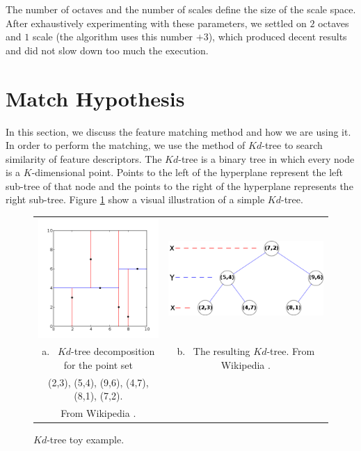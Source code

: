 \documentclass[]{IEEEtran}
\begin{document}
  The number of octaves and the number of scales define the size of the scale space. After exhaustively experimenting with these parameters, we settled on $2$ octaves and $1$ scale (the algorithm uses this number $+ 3$), which produced decent results and did not slow down too much the execution.

  \section{Match Hypothesis}
  In this section, we discuss the feature matching method and how we are using it. In order to perform the matching, we use the method of $Kd$-tree\cite{kd_tree} to search similarity of feature descriptors.
  The $Kd$-tree is a binary tree in which every node is a $K$-dimensional point. Points to the left of the hyperplane represent the left sub-tree of that node and the points to the right of the hyperplane represents the right sub-tree\cite{sift_kdtree}. Figure \ref{fig:kdtree} show a visual illustration of a simple $Kd$-tree.

\begin{figure}[tb]
  \centering
  \begin{tabular}{c c}
  \includegraphics[width=0.23\linewidth]{./figures/kdtree/kdtree_2d.png} &
  \includegraphics[width=0.4\linewidth]{./figures/kdtree/kdtree.png}\\
  a.~ $Kd$-tree decomposition for the point set & b.~ The resulting $Kd$-tree. From Wikipedia \cite{wikipedia_kd1d}.\\
  (2,3), (5,4), (9,6), (4,7), (8,1), (7,2). & \\
From Wikipedia \cite{wikipedia_kd2d}.
  \end{tabular}
  \caption{$Kd$-tree toy example.}
  \label{fig:kdtree}
\end{figure}
\end{document}
